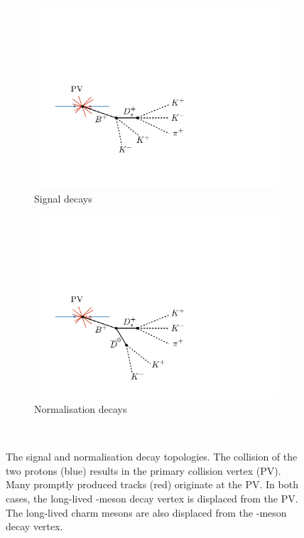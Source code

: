 \begin{figure}[!h]
    \centering
    \begin{subfigure}[t]{0.4\textwidth}
        \includegraphics[width=1.0\textwidth]{figs/Selection/B2DsKK_topology.pdf}
        \caption{Signal decays}
    \end{subfigure}%
    \begin{subfigure}[t]{0.4\textwidth}
        \includegraphics[width=1.0\textwidth]{figs/Selection/B2DsD0_topology.pdf}
        \caption{Normalisation decays}
    \end{subfigure}\\
    \caption{The signal and normalisation decay topologies. The collision of the two protons (blue) results in the primary collision vertex (PV). Many promptly produced tracks (red) originate at the PV. In both cases, the long-lived \Bp-meson decay vertex is displaced from the PV. The long-lived charm mesons are also displaced from the \Bp-meson decay vertex.}
    \label{fig:topo}   
\end{figure}

